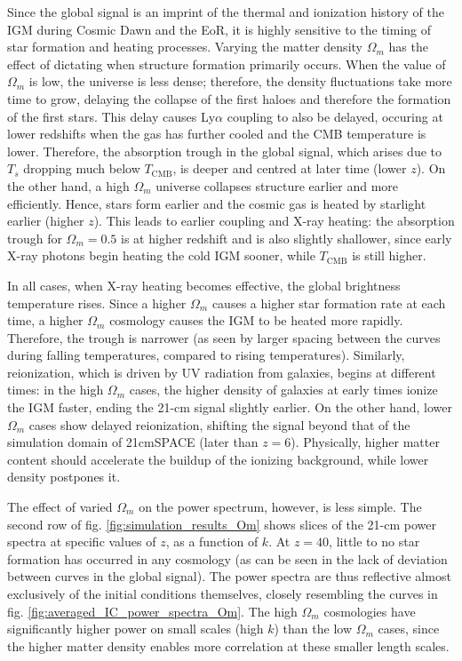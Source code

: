 \documentclass[floats,floatfix,showpacs,amssymb,prd,superscriptaddress,nofootinbib]{revtex4-2} %
\begin{document}
Since the global signal is an imprint of the thermal and ionization history of the IGM during Cosmic Dawn and the EoR, it is highly sensitive to the timing of star formation and heating processes. Varying the matter density $\Omega_m$ has the effect of dictating when structure formation primarily occurs. When the value of $\Omega_m$ is low, the universe is less dense; therefore, the density fluctuations take more time to grow, delaying the collapse of the first haloes and therefore the formation of the first stars. This delay causes Ly$\alpha$ coupling to also be delayed, occuring at lower redshifts when the gas has further cooled and the CMB temperature is lower. Therefore, the absorption trough in the global signal, which arises due to $T_s$ dropping much below $T_\text{CMB}$, is deeper and centred at later time (lower $z$). On the other hand, a high $\Omega_m$ universe collapses structure earlier and more efficiently. Hence, stars form earlier and the cosmic gas is heated by starlight earlier (higher $z$). This leads to earlier coupling and X-ray heating: the absorption trough for $\Omega_m = 0.5$ is at higher redshift and is also slightly shallower, since early X-ray photons begin heating the cold IGM sooner, while $T_\text{CMB}$ is still higher. 

In all cases, when X-ray heating becomes effective, the global brightness temperature rises. Since a higher $\Omega_m$ causes a higher star formation rate at each time, a higher $\Omega_m$ cosmology causes the IGM to be heated more rapidly. Therefore, the trough is narrower (as seen by larger spacing between the curves during falling temperatures, compared to rising temperatures). Similarly, reionization, which is driven by UV radiation from galaxies, begins at different times: in the high $\Omega_m$ cases, the higher density of galaxies at early times ionize the IGM faster, ending the 21-cm signal slightly earlier. On the other hand, lower $\Omega_m$ cases show delayed reionization, shifting the signal beyond that of the simulation domain of 21cmSPACE (later than $z = 6$). Physically, higher matter content should accelerate the buildup of the ionizing background, while lower density postpones it.

The effect of varied $\Omega_m$ on the power spectrum, however, is less simple. The second row of fig. \ref{fig:simulation_results_Om} shows slices of the 21-cm power spectra at specific values of $z$, as a function of $k$. At $z = 40$, little to no star formation has occurred in any cosmology (as can be seen in the lack of deviation between curves in the global signal). The power spectra are thus reflective almost exclusively of the initial conditions themselves, closely resembling the curves in fig. \ref{fig:averaged_IC_power_spectra_Om}.
The high $\Omega_m$ cosmologies have significantly higher power on small scales (high $k$) than the low $\Omega_m$ cases, since the higher matter density enables more correlation at these smaller length scales. 
\end{document}
